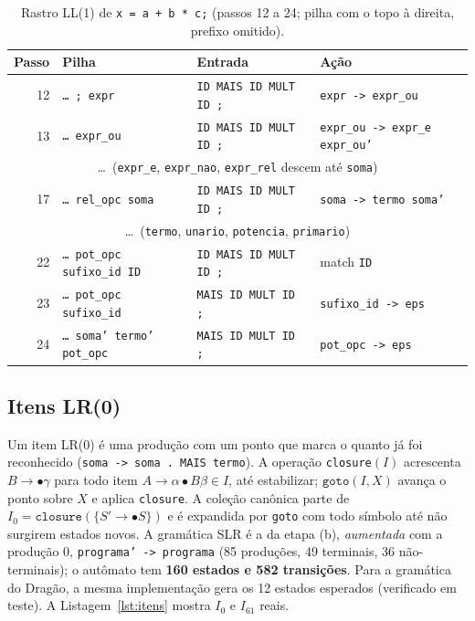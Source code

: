 \documentclass[conference]{IEEEtran}
\begin{document}
\begin{table}[t]
\centering
\caption{Rastro LL(1) de \texttt{x = a + b * c;} (passos 12 a 24; pilha com o topo à direita, prefixo omitido).}\label{tab:rastroll1}
\scriptsize
\begin{tabular}{@{}rlll@{}}
\toprule
Passo & Pilha & Entrada & Ação \\
\midrule
12 & \texttt{\dots\ ; expr}                       & \texttt{ID MAIS ID MULT ID ;}  & \texttt{expr -> expr\_ou} \\
13 & \texttt{\dots\ expr\_ou}                     & \texttt{ID MAIS ID MULT ID ;}  & \texttt{expr\_ou -> expr\_e expr\_ou'} \\
\multicolumn{4}{c}{\dots\ (\texttt{expr\_e}, \texttt{expr\_nao}, \texttt{expr\_rel} descem até \texttt{soma})} \\
17 & \texttt{\dots\ rel\_opc soma}                & \texttt{ID MAIS ID MULT ID ;}  & \texttt{soma -> termo soma'} \\
\multicolumn{4}{c}{\dots\ (\texttt{termo}, \texttt{unario}, \texttt{potencia}, \texttt{primario})} \\
22 & \texttt{\dots\ pot\_opc sufixo\_id ID}       & \texttt{ID MAIS ID MULT ID ;}  & match \texttt{ID} \\
23 & \texttt{\dots\ pot\_opc sufixo\_id}          & \texttt{MAIS ID MULT ID ;}     & \texttt{sufixo\_id -> eps} \\
24 & \texttt{\dots\ soma' termo' pot\_opc}        & \texttt{MAIS ID MULT ID ;}     & \texttt{pot\_opc -> eps} \\
\bottomrule
\end{tabular}
\end{table}

\subsection{Itens LR(0)}\label{sec:lr0}
Um item LR(0) é uma produção com um ponto que marca o quanto já foi
reconhecido (\texttt{soma -> soma . MAIS termo}). A operação
\texttt{closure}$(I)$ acrescenta $B\to\bullet\gamma$ para todo item
$A\to\alpha\bullet B\beta\in I$, até estabilizar; $\texttt{goto}(I,X)$ avança o
ponto sobre $X$ e aplica \texttt{closure}. A coleção canônica parte de
$I_0=\texttt{closure}(\{S'\to\bullet S\})$ e é expandida por \texttt{goto} com
todo símbolo até não surgirem estados novos. A gramática SLR é a da etapa (b),
\emph{aumentada} com a produção 0, \texttt{programa' -> programa}
(85 produções, 49 terminais, 36 não-terminais); o autômato tem
\textbf{160 estados e 582 transições}. Para a gramática do Dragão, a
mesma implementação gera os 12 estados esperados (verificado em teste).
A Listagem~\ref{lst:itens} mostra $I_0$ e $I_{61}$ reais.
\end{document}
